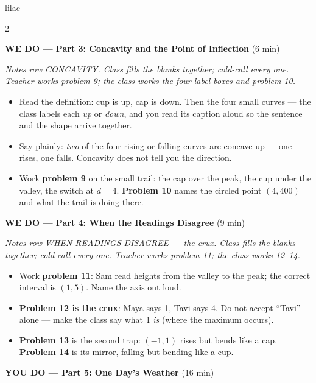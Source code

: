 \documentclass[10pt]{article}
\begin{document}
\begin{skillbox}{lilac}
\begin{multicols}{2}
\columnbreak

\textbf{WE DO --- Part 3: Concavity and the Point of Inflection} (6 min)

\textit{Notes row CONCAVITY. Class fills the blanks together; cold-call every one. Teacher
works problem 9; the class works the four label boxes and problem 10.}
\begin{itemize}
  \item Read the definition: cup is up, cap is down. Then the four small curves --- the class
        labels each \textit{up} or \textit{down}, and you read its caption aloud so the
        sentence and the shape arrive together.
  \item Say plainly: \emph{two} of the four rising-or-falling curves are concave up --- one
        rises, one falls. Concavity does not tell you the direction.
  \item Work \textbf{problem 9} on the small trail: the cap over the peak, the cup under the
        valley, the switch at $d = 4$. \textbf{Problem 10} names the circled point
        $(4, 400)$ and what the trail is doing there.
\end{itemize}

\textbf{WE DO --- Part 4: When the Readings Disagree} (9 min)

\textit{Notes row WHEN READINGS DISAGREE --- the crux. Class fills the blanks together;
cold-call every one. Teacher works problem 11; the class works 12--14.}
\begin{itemize}
  \item Work \textbf{problem 11}: Sam read heights from the valley to the peak; the correct
        interval is $(1, 5)$. Name the axis out loud.
  \item \textbf{Problem 12 is the crux}: Maya says 1, Tavi says 4. Do not accept ``Tavi''
        alone --- make the class say what 1 \emph{is} (where the maximum occurs).
  \item \textbf{Problem 13} is the second trap: $(-1, 1)$ rises but bends like a cap.
        \textbf{Problem 14} is its mirror, falling but bending like a cup.
\end{itemize}

\textbf{YOU DO --- Part 5: One Day's Weather} (16 min)


\end{multicols}
\end{skillbox}
\end{document}

